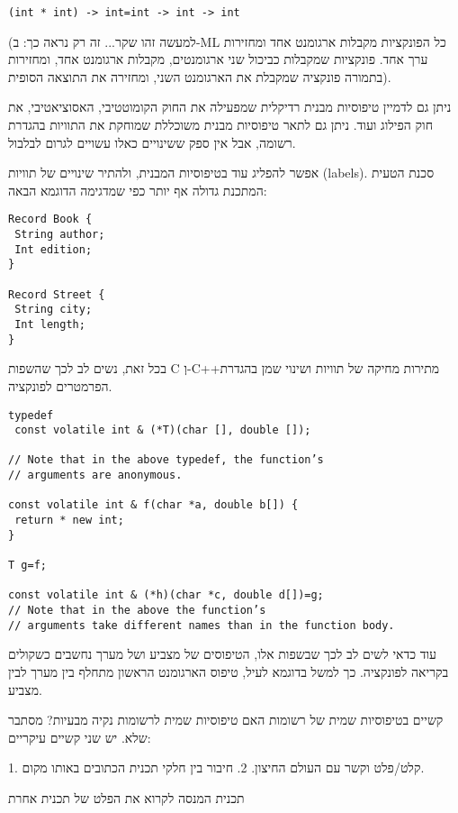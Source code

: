 \begin{verbatim}
(int * int) -> int=int -> int -> int
\end{verbatim}

      (למעשה זהו שקר... זה רק נראה כך: ב-ML כל הפונקציות מקבלות ארגומנט אחד ומחזירות ערך אחד. פונקציות שמקבלות כביכול שני ארגומנטים, מקבלות ארגומנט אחד, ומחזירות בתמורה פונקציה שמקבלת את הארגומנט השני, ומחזירה את התוצאה הסופית).

      ניתן גם לדמיין טיפוסיות מבנית רדיקלית שמפעילה את החוק הקומוטטיבי, האסוציאטיבי, את חוק הפילוג ועוד. ניתן גם לתאר טיפוסיות מבנית משוכללת שמוחקת את התוויות בהגדרת רשומה, אבל אין ספק ששינויים כאלו עשויים לגרום לבלבול.

      אפשר להפליג עוד בטיפוסיות המבנית, ולהתיר שינויים של תוויות (labels). סכנת הטעית המתכנת גדולה אף יותר כפי שמדגימה הדוגמא הבאה:

\begin{verbatim}
Record Book {
 String author;
 Int edition;
}

Record Street {
 String city;
 Int length;
}
\end{verbatim}

      בכל זאת, נשים לב לכך שהשפות C וְ-C++מתירות מחיקה של תוויות ושינוי שמן בהגדרת הפרמטרים לפונקציה.

\begin{verbatim}
typedef
 const volatile int & (*T)(char [], double []);

// Note that in the above typedef, the function’s
// arguments are anonymous.

const volatile int & f(char *a, double b[]) {
 return * new int;
}

T g=f;

const volatile int & (*h)(char *c, double d[])=g;
// Note that in the above the function’s
// arguments take different names than in the function body.

\end{verbatim}

      עוד כדאי לשים לב לכך שבשפות אלו, הטיפוסים של מצביע ושל מערך נחשבים כשקולים
      בקריאה לפונקציה. כך למשל בדוגמא לעיל, טיפוס הארגומנט הראשון מתחלף בין מערך לבין
      מצביע.

      קשיים בטיפוסיות שמית של רשומות האם טיפוסיות שמית לרשומות נקיה מבעיות? מסתבר
      שלא. יש שני קשיים עיקריים:

      1. קלט/פלט וקשר עם העולם החיצון.
      2. חיבור בין חלקי תכנית הכתובים באותו מקום.

      תכנית המנסה לקרוא את הפלט של תכנית אחרת

